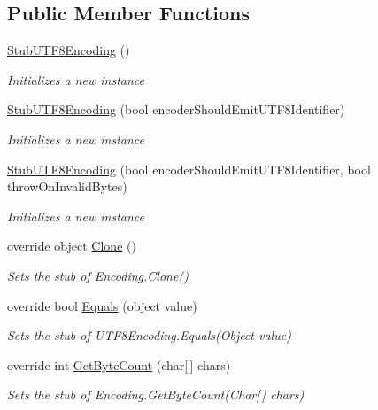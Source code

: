 \subsection*{Public Member Functions}
\begin{DoxyCompactItemize}
\item 
\hyperlink{class_system_1_1_text_1_1_fakes_1_1_stub_u_t_f8_encoding_a7029f8df919b26119109d7d9cb85a8f4}{Stub\-U\-T\-F8\-Encoding} ()
\begin{DoxyCompactList}\small\item\em Initializes a new instance\end{DoxyCompactList}\item 
\hyperlink{class_system_1_1_text_1_1_fakes_1_1_stub_u_t_f8_encoding_a205058a44e2b40537e89a5a4d675b866}{Stub\-U\-T\-F8\-Encoding} (bool encoder\-Should\-Emit\-U\-T\-F8\-Identifier)
\begin{DoxyCompactList}\small\item\em Initializes a new instance\end{DoxyCompactList}\item 
\hyperlink{class_system_1_1_text_1_1_fakes_1_1_stub_u_t_f8_encoding_a2ed4eb6cd75f537d41ba7c1c7c08018b}{Stub\-U\-T\-F8\-Encoding} (bool encoder\-Should\-Emit\-U\-T\-F8\-Identifier, bool throw\-On\-Invalid\-Bytes)
\begin{DoxyCompactList}\small\item\em Initializes a new instance\end{DoxyCompactList}\item 
override object \hyperlink{class_system_1_1_text_1_1_fakes_1_1_stub_u_t_f8_encoding_ac1403e37060822f513314fa5e6c7c34f}{Clone} ()
\begin{DoxyCompactList}\small\item\em Sets the stub of Encoding.\-Clone()\end{DoxyCompactList}\item 
override bool \hyperlink{class_system_1_1_text_1_1_fakes_1_1_stub_u_t_f8_encoding_a2566f875db7b0384d8952814eceebbdc}{Equals} (object value)
\begin{DoxyCompactList}\small\item\em Sets the stub of U\-T\-F8\-Encoding.\-Equals(\-Object value)\end{DoxyCompactList}\item 
override int \hyperlink{class_system_1_1_text_1_1_fakes_1_1_stub_u_t_f8_encoding_adf1dec7cbf4694a9d3181344f2e15e34}{Get\-Byte\-Count} (char\mbox{[}$\,$\mbox{]} chars)
\begin{DoxyCompactList}\small\item\em Sets the stub of Encoding.\-Get\-Byte\-Count(\-Char\mbox{[}$\,$\mbox{]} chars)\end{DoxyCompactList}\item 

\end{DoxyCompactItemize}
